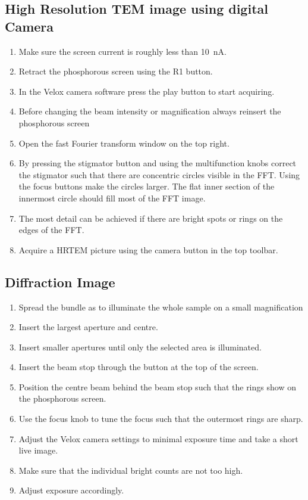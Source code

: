\documentclass[a4paper]{scrartcl}
\begin{document}
\subsection*{High Resolution TEM image using digital Camera}
\begin{enumerate}
    \item Make sure the screen current is roughly less than \SI{10}{\nano \ampere}.
    \item Retract the phosphorous screen using the R1 button.
    \item In the Velox camera software press the play button to start acquiring.
    \item Before changing the beam intensity or magnification always reinsert the phosphorous screen
    \item Open the fast Fourier transform window on the top right.
    \item By pressing the stigmator button and using the multifunction knobs correct the stigmator such that there are concentric circles visible in the FFT. Using the focus buttons make the circles larger. The flat inner section of the innermost circle should fill most of the FFT image. 
    \item The most detail can be achieved if there are bright spots or rings on the edges of the FFT.
    \item Acquire a HRTEM picture using the camera button in the top toolbar.
\end{enumerate}

\subsection*{Diffraction Image}
\begin{enumerate}
    \item Spread the bundle as to illuminate the whole sample on a small magnification
    \item Insert the largest aperture and centre.
    \item Insert smaller apertures until only the selected area is illuminated.
    \item Insert the beam stop through the button at the top of the screen.
    \item Position the centre beam behind the beam stop such that the rings show on the phosphorous screen.
    \item Use the focus knob to tune the focus such that the outermost rings are sharp.
    \item Adjust the Velox camera settings to minimal exposure time and take a short live image.
    \item Make sure that the individual bright counts are not too high.
    \item Adjust exposure accordingly.
    
\end{enumerate}
\end{document}
